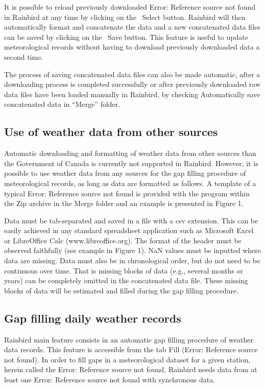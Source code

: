 \documentclass[12pt, letterpaper, fleqn]{report}
\begin{document}
It is possible to reload previously downloaded Error: Reference source not found in Rainbird at any time by clicking on the  Select button. Rainbird will then automatically format and concatenate the data and a new concatenated data files can be saved by clicking on the  Save button. This feature is useful to update meteorological records without having to download previously downloaded data a second time.

The process of saving concatenated data files can also be made automatic, after a downloading process is completed successfully or after previously downloaded raw data files have been loaded manually in Rainbird, by checking Automatically save concatenated data in “Merge” folder.

\subsection{Use of weather data from other sources}

Automatic downloading and formatting of weather data from other sources than the Government of Canada is currently not supported in Rainbird. However, it is possible to use weather data from any sources for the gap filling procedure of meteorological records, as long as data are formatted as follows. A template of a typical Error: Reference source not found is provided with the program within the Zip archive in the Merge folder and an example is presented in Figure 1.

Data must be tab-separated and saved in a file with a csv extension. This can be easily achieved in any standard spreadsheet application such as Microsoft Excel or LibreOffice Calc (www.libreoffice.org). The format of the header must be observed faithfully (see example in Figure 1). NaN values must be inputted where data are missing. Data must also be in chronological order, but do not need to be continuous over time. That is missing blocks of data (e.g., several months or years) can be completely omitted in the concatenated data file. These missing blocks of data will be estimated and filled during the gap filling procedure.

\subsection{Gap filling daily weather records}

Rainbird main feature consists in an automatic gap filling procedure of weather data records. This feature is accessible from the tab Fill (Error: Reference source not found). In order to fill gaps in a meteorological dataset for a given station, herein called the Error: Reference source not found, Rainbird needs data from at least one Error: Reference source not found with synchronous data.
\end{document}
